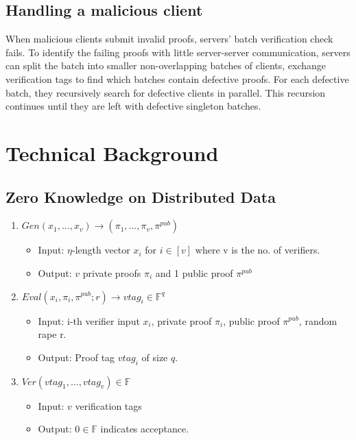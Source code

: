 \subsection{Handling a malicious client}
When malicious clients submit invalid proofs, servers' batch verification check fails. To identify the failing proofs with little server-server communication, servers can split the batch into smaller non-overlapping batches of clients, exchange verification tags to find which batches contain defective proofs. For each defective batch, they recursively search for defective clients in parallel. This recursion continues until they are left with defective singleton batches.


\section{Technical Background}
\subsection{Zero Knowledge on Distributed Data}
\begin{enumerate}
    \item $Gen(x_1, ..., x_v) \rightarrow (\pi_1, ..., \pi_v, \pi^{pub})$
    \begin{itemize}
        \item Input: $\eta$-length vector $x_i$ for $i \in [v]$ where v is the no. of verifiers.
        \item Output: $v$ private proofs $\pi_i$ and 1 public proof $\pi^{pub}$
    \end{itemize}
    \item $Eval(x_i, \pi_i, \pi^{pub}; r) \rightarrow vtag_i \in \mathbb{F}^q$
    \begin{itemize}
        \item Input: i-th verifier input $x_i$, private proof $\pi_i$, public proof $\pi^{pub}$, random rape r.
        \item Output: Proof tag $vtag_i$ of size $q$.
    \end{itemize}
    \item $Ver(vtag_1, ..., vtag_v) \in \mathbb{F}$ 
    \begin{itemize}
        \item Input: $v$ verification tags 
        \item Output: $0 \in \mathbb{F}$ indicates acceptance.
    \end{itemize}
\end{enumerate}

